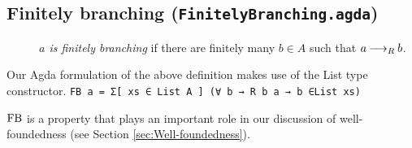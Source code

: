 

\subsection{Finitely branching (\texttt{FinitelyBranching.agda})}

\begin{definition} \hfill
    \begin{description}
        \item[] \emph{$a$ is finitely branching} if there are finitely many $b \in A$ such that $a \mathbin{\longrightarrow_R} b$.
    \end{description}
\end{definition}

Our Agda formulation of the above definition makes use of the List type constructor.
\verb|FB a = Σ[ xs ∈ List A ] (∀ b → R b a → b ∈List xs)|

$\mathrm{FB}$ is a property that plays an important role in our discussion of well-foundedness (see Section \ref{sec:Well-foundedness}).

